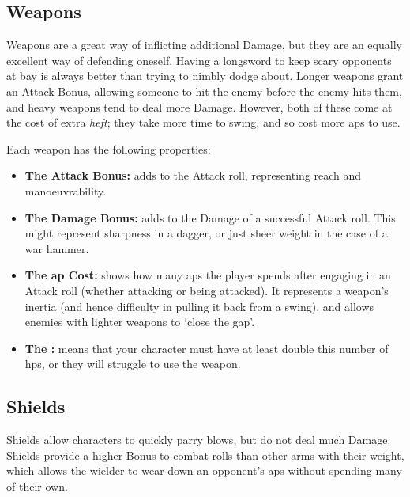 \begin{multicols}{2}

\subsection{Weapons}

\noindent
Weapons are a great way of inflicting additional Damage, but they are an equally excellent way of defending oneself.
Having a longsword to keep scary opponents at bay is always better than trying to nimbly dodge about.
Longer weapons grant an Attack Bonus, allowing someone to hit the enemy before the enemy hits them, and heavy weapons tend to deal more Damage.
However, both of these come at the cost of extra \emph{heft}; they take more time to swing, and so cost more \glspl{ap} to use.

Each weapon has the following properties:

\begin{itemize}

  \item
  \textbf{The Attack Bonus:} adds to the Attack roll, representing reach and manoeuvrability.
  \item
  \textbf{The Damage Bonus:} adds to the Damage of a successful Attack roll.
  This might represent sharpness in a dagger, or just sheer weight in the case of a war hammer.
  \item
  \textbf{The \Gls{ap} Cost:} shows how many \glspl{ap} the player spends after engaging in an Attack roll (whether attacking or being attacked).
  It represents a weapon's inertia (and hence difficulty in pulling it back from a swing), and allows enemies with lighter weapons to `close the gap'.
  \item
  \textbf{The :} means that your character must have at least double this number of \glspl{hp}, or they will struggle to use the weapon.
\end{itemize}

\weaponsChart

\bigLine

\label{weaponschart}

\subsection{Shields}

Shields allow characters to quickly parry blows, but do not deal much Damage.
Shields provide a higher Bonus to combat rolls than other arms with their \gls{weight}, which allows the wielder to wear down an opponent's \glspl{ap} without spending many of their own.


\end{multicols}
